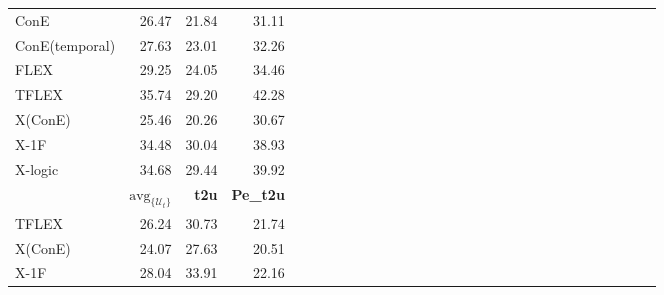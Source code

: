 \begin{table*}
{\begin{tabular}{lrrrrrrrrrrrrrrrrrrrrrrrrrrrrr }
      ConE           & 26.47                            & 21.84            & 31.11                                                                                                                                      \\
      ConE(temporal) & 27.63&  23.01&  32.26\\
      FLEX           & 29.25                            & 24.05            & 34.46                                                                                                                                      \\
      TFLEX          & 35.74                            & 29.20            & 42.28                                                                                                                                      \\
      X(ConE)        & 25.46                            & 20.26            & 30.67                                                                                                                                      \\
      X-1F           & 34.48                            & 30.04            & 38.93                                                                                                                                      \\
      X-logic        & 34.68                            & 29.44            & 39.92                                                                                                                                      \\
      \midrule
      \midrule
                     & $\text{avg}_{\{\mathcal{U}_t\}}$ & \textbf{t2u}     & \textbf{Pe\_t2u}                                                                                                                           \\
      \midrule
      TFLEX          & 26.24                            & 30.73            & 21.74                                                                                                                                      \\
      X(ConE)        & 24.07                            & 27.63            & 20.51                                                                                                                                      \\
      X-1F           & 28.04                            & 33.91            & 22.16                                                                                                                                      \\

\end{tabular}}
\end{table*}
